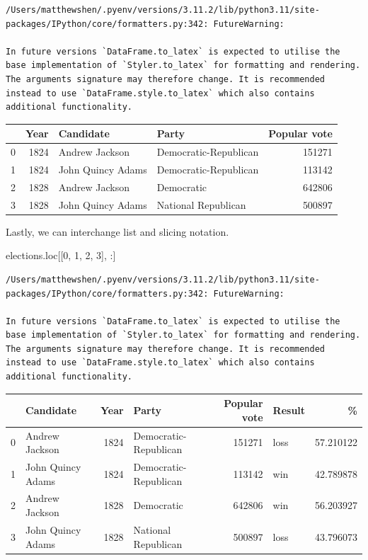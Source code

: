 \documentclass[
  letterpaper,
  DIV=11,
  numbers=noendperiod]{scrreprt}
\newenvironment{Shaded}{\begin{snugshade}}{\end{snugshade}}
\newcommand{\DecValTok}[1]{\textcolor[rgb]{0.68,0.00,0.00}{#1}}
\newcommand{\NormalTok}[1]{\textcolor[rgb]{0.00,0.23,0.31}{#1}}
\begin{document}
\begin{verbatim}
/Users/matthewshen/.pyenv/versions/3.11.2/lib/python3.11/site-packages/IPython/core/formatters.py:342: FutureWarning:

In future versions `DataFrame.to_latex` is expected to utilise the base implementation of `Styler.to_latex` for formatting and rendering. The arguments signature may therefore change. It is recommended instead to use `DataFrame.style.to_latex` which also contains additional functionality.
\end{verbatim}

\begin{tabular}{lrllr}
\toprule
{} &  Year &          Candidate &                  Party &  Popular vote \\
\midrule
0 &  1824 &     Andrew Jackson &  Democratic-Republican &        151271 \\
1 &  1824 &  John Quincy Adams &  Democratic-Republican &        113142 \\
2 &  1828 &     Andrew Jackson &             Democratic &        642806 \\
3 &  1828 &  John Quincy Adams &    National Republican &        500897 \\
\bottomrule
\end{tabular}

Lastly, we can interchange list and slicing notation.

\begin{Shaded}
\begin{Highlighting}[]
\NormalTok{elections.loc[[}\DecValTok{0}\NormalTok{, }\DecValTok{1}\NormalTok{, }\DecValTok{2}\NormalTok{, }\DecValTok{3}\NormalTok{], :]}
\end{Highlighting}
\end{Shaded}

\begin{verbatim}
/Users/matthewshen/.pyenv/versions/3.11.2/lib/python3.11/site-packages/IPython/core/formatters.py:342: FutureWarning:

In future versions `DataFrame.to_latex` is expected to utilise the base implementation of `Styler.to_latex` for formatting and rendering. The arguments signature may therefore change. It is recommended instead to use `DataFrame.style.to_latex` which also contains additional functionality.
\end{verbatim}

\begin{tabular}{llrlrlr}
\toprule
{} &          Candidate &  Year &                  Party &  Popular vote & Result &          \% \\
\midrule
0 &     Andrew Jackson &  1824 &  Democratic-Republican &        151271 &   loss &  57.210122 \\
1 &  John Quincy Adams &  1824 &  Democratic-Republican &        113142 &    win &  42.789878 \\
2 &     Andrew Jackson &  1828 &             Democratic &        642806 &    win &  56.203927 \\
3 &  John Quincy Adams &  1828 &    National Republican &        500897 &   loss &  43.796073 \\
\bottomrule
\end{tabular}
\end{document}
